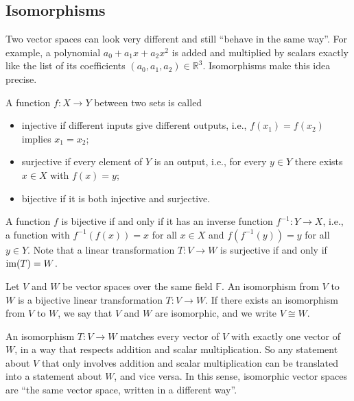 \subsection{Isomorphisms}

Two vector spaces can look very different and still ``behave in the same way''. For example, a polynomial $a_0 + a_1 x + a_2 x^2$ is added and multiplied by scalars exactly like the list of its coefficients $(a_0, a_1, a_2) \in \mathbb{R}^3$. Isomorphisms make this idea precise.

\begin{definition}
    A function $f: X \to Y$ between two sets is called
    \begin{itemize}
        \item injective if different inputs give different outputs, i.e., $f(x_1) = f(x_2)$ implies $x_1 = x_2$;
        \item surjective if every element of $Y$ is an output, i.e., for every $y \in Y$ there exists $x \in X$ with $f(x) = y$;
        \item bijective if it is both injective and surjective.
    \end{itemize}
    A function $f$ is bijective if and only if it has an inverse function $f^{-1}: Y \to X$, i.e., a function with $f^{-1}(f(x)) = x$ for all $x \in X$ and $f(f^{-1}(y)) = y$ for all $y \in Y$. Note that a linear transformation $T: V \to W$ is surjective if and only if $\operatorname{im}(T) = W$.
\end{definition}

\begin{definition}[Isomorphism]
    Let $V$ and $W$ be vector spaces over the same field $\mathbb{F}$. An isomorphism from $V$ to $W$ is a bijective linear transformation $T: V \to W$. If there exists an isomorphism from $V$ to $W$, we say that $V$ and $W$ are isomorphic, and we write $V \cong W$.
\end{definition}

\begin{remark}
    An isomorphism $T: V \to W$ matches every vector of $V$ with exactly one vector of $W$, in a way that respects addition and scalar multiplication. So any statement about $V$ that only involves addition and scalar multiplication can be translated into a statement about $W$, and vice versa. In this sense, isomorphic vector spaces are ``the same vector space, written in a different way''.
\end{remark}

